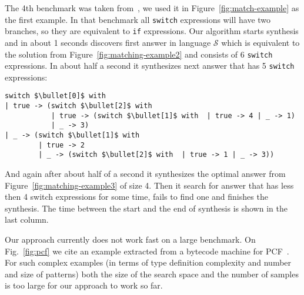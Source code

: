 The 4th benchmark was taken from~\cite{maranget2008}, we used it in %
Figure~\ref{fig:match-example}
 as the first example. In that benchmark 
 all \lstinline=switch= expressions will have two branches, so they are equivalent to \lstinline=if= expressions. Our algorithm starts synthesis and in about 1 seconds discovers first answer in language $\mathcal{S}$ which is equivalent to the solution from Figure~\ref{fig:matching-example2} and consists of 6 \lstinline=switch= expressions. In about half a second it synthesizes next answer that has 5 \lstinline=switch= expressions:

\begin{lstlisting}
switch $\bullet[0]$ with
| true -> (switch $\bullet[2]$ with  
           | true -> (switch $\bullet[1]$ with  | true -> 4 | _ -> 1)
           | _ -> 3)
| _ -> (switch $\bullet[1]$ with  
        | true -> 2
        | _ -> (switch $\bullet[2]$ with  | true -> 1 | _ -> 3))
\end{lstlisting}
\noindent And again after about half of a second it synthesizes the optimal answer from Figure~\ref{fig:matching-example3} of size 4. Then it search for answer that has less then 4 switch expressions for some time, fails to find one and finishes the synthesis. The time between the start and the end of synthesis is shown in the last column.

Our approach currently does not work fast on a large benchmark. On Fig.~\ref{fig:pcf} we cite an example extracted from a bytecode
machine for PCF~\cite{Plotkin1977LCFCA,maranget2008}. For such complex examples (in terms of type definition complexity and number and size of patterns)
both the size of the search space and the number of samples is too large for our approach to work so far.




